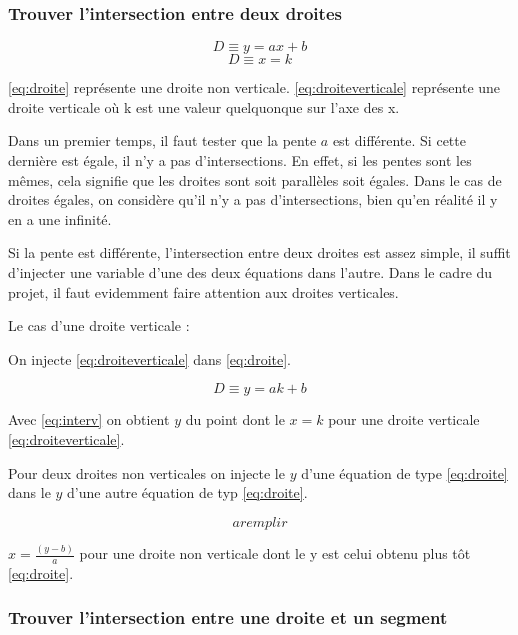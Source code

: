 \documentclass[]{article}
\begin{document}
\subsubsection{Trouver l'intersection entre deux droites}



\begin{equation} \label{eq:droite}
	D \equiv y = ax + b 
\end{equation}
\begin{equation} \label{eq:droiteverticale}
	D \equiv x = k 
\end{equation}


\eqref {eq:droite} 
représente une droite non verticale.
\eqref {eq:droiteverticale} 
représente une droite verticale où k est une valeur
quelquonque sur l'axe des x.

Dans un premier temps, il faut tester que la pente $a$ est différente. 
Si cette dernière est égale, il n'y a pas d'intersections. En effet,
si les pentes sont les mêmes, cela signifie que les droites sont soit
parallèles soit égales. Dans le cas de droites égales, on considère qu'il
n'y a pas d'intersections, bien qu'en réalité il y en a une infinité.

Si la pente est différente,
l'intersection entre deux droites est assez simple, il suffit 
d'injecter une variable d'une des deux équations dans l'autre.
Dans le cadre du projet, il faut evidemment faire attention aux 
droites verticales.

Le cas d'une droite verticale : 

On injecte \eqref{eq:droiteverticale} dans \eqref{eq:droite}.

\begin{equation} \label{eq:interv}
	D \equiv y = ak + b
\end{equation}

Avec \eqref{eq:interv} on obtient $y$ du point dont le $x = k$
pour une droite verticale \eqref{eq:droiteverticale}.

Pour deux droites non verticales on injecte le $y$ d'une équation
de type \eqref{eq:droite} dans le $y$ d'une autre équation de typ \eqref{eq:droite}.

\begin{equation} \label{eq:internv}
	a remplir
\end{equation}

$ x = \frac {(y - b)}{ a} $ pour une droite non verticale
dont le y est celui obtenu plus tôt \eqref{eq:droite}.

\subsubsection{Trouver l'intersection entre une droite et un segment}
\end{document}
